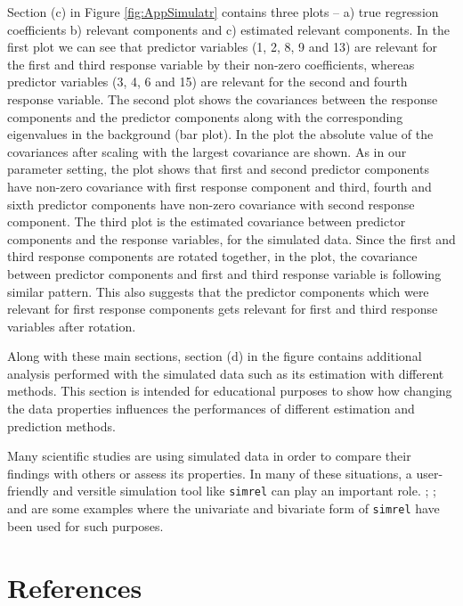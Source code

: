 \documentclass[3p,times,12pt,authoryear]{elsarticle}
\theoremstyle{definition}
\theoremstyle{definition}
\theoremstyle{remark}
\begin{document}
Section (c) in Figure \ref{fig:AppSimulatr} contains three plots -- a)
true regression coefficients b) relevant components and c) estimated
relevant components. In the first plot we can see that predictor
variables (1, 2, 8, 9 and 13) are relevant for the first and third
response variable by their non-zero coefficients, whereas predictor
variables (3, 4, 6 and 15) are relevant for the second and fourth
response variable. The second plot shows the covariances between the
response components and the predictor components along with the
corresponding eigenvalues in the background (bar plot). In the plot the
absolute value of the covariances after scaling with the largest
covariance are shown. As in our parameter setting, the plot shows that
first and second predictor components have non-zero covariance with
first response component and third, fourth and sixth predictor
components have non-zero covariance with second response component. The
third plot is the estimated covariance between predictor components and
the response variables, for the simulated data. Since the first and
third response components are rotated together, in the plot, the
covariance between predictor components and first and third response
variable is following similar pattern. This also suggests that the
predictor components which were relevant for first response components
gets relevant for first and third response variables after rotation.

Along with these main sections, section (d) in the figure contains
additional analysis performed with the simulated data such as its
estimation with different methods. This section is intended for
educational purposes to show how changing the data properties influences
the performances of different estimation and prediction methods.

Many scientific studies
\citep{helland2012near, saebo2008lpls, cook2015simultaneous} are using
simulated data in order to compare their findings with others or assess
its properties. In many of these situations, a user-friendly and
versitle simulation tool like \texttt{simrel} can play an important
role. \citet{gangsei2016theoretical}; \citet{gangsei2016linear}; and
\citet{saebo2015simrel} are some examples where the univariate and
bivariate form of \texttt{simrel} have been used for such purposes.

\section{References}\label{references}


\renewcommand\refname{References}

\end{document}
